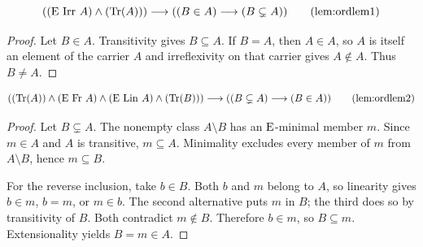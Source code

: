 \begin{lemma}
\[
((\E\mathrm{\ Irr\ }A)\land(\Tr(A)))
\implies
(
(B\in A)
\implies
(B\subsetneq A))
\labeltagd{lem}{ordlem1}
\]
\end{lemma}
\begin{proof}
Let $B\in A$. Transitivity gives $B\subseteq A$. If $B=A$, then
$A\in A$, so $A$ is itself an element of the carrier $A$ and
irreflexivity on that carrier gives $A\notin A$. Thus $B\ne A$.
\end{proof}
\begin{lemma}
\[
(
(\Tr(A))\land
(\E\mathrm{\ Fr\ }A)\land
(\E\mathrm{\ Lin\ }A)\land
(\Tr(B))
)
\implies
(
(B\subsetneq A)
\implies
(B\in A)
)
\clabeltagd{lem}{ordlem2}
\]
\end{lemma}
\begin{proof}
Let $B\subsetneq A$. The nonempty class $A\setminus B$ has an
$\mathrm{E}$-minimal member $m$. Since $m\in A$ and $A$ is transitive,
$m\subseteq A$. Minimality excludes every member of $m$ from
$A\setminus B$, hence $m\subseteq B$.

For the reverse inclusion, take $b\in B$. Both $b$ and $m$ belong to
$A$, so linearity gives $b\in m$, $b=m$, or $m\in b$. The second
alternative puts $m$ in $B$; the third does so by transitivity of $B$.
Both contradict $m\notin B$. Therefore $b\in m$, so $B\subseteq m$.
Extensionality yields $B=m\in A$.
\end{proof}

